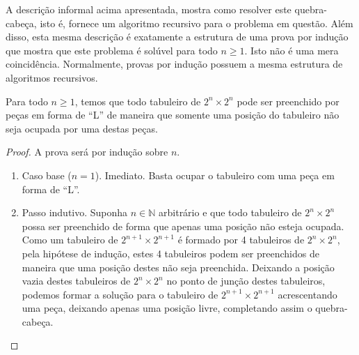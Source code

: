 A descrição informal acima apresentada, mostra como resolver este
quebra-cabeça, isto é, fornece um algoritmo recursivo para o problema
em questão. Além disso, esta mesma descrição é exatamente a estrutura
de uma prova por indução que mostra que este problema é solúvel para
todo $n \geq 1$. Isto não é uma mera coincidência. Normalmente, provas
por indução possuem a mesma estrutura de algoritmos recursivos.

\begin{Theorem}
Para todo $n \geq 1$, temos que todo tabuleiro de $2^n \times 2^n$
pode ser preenchido por peças em forma de ``L'' de maneira que somente
uma posição do tabuleiro não seja ocupada por uma destas peças.
\end{Theorem}
\begin{proof}
A prova será por indução sobre $n$.
\begin{enumerate}
  \item Caso base ($n = 1$). Imediato. Basta ocupar o tabuleiro com
    uma peça em forma de ``L''.
  \item Passo indutivo. Suponha $n \in \mathbb{N}$ arbitrário e que
    todo tabuleiro de $2^n \times 2^n$ possa ser preenchido de forma que
    apenas uma posição não esteja ocupada. Como um tabuleiro de $2^{n
      + 1} \times 2^{n + 1}$ é formado por 4 tabuleiros de $2^n\times
    2^n$, pela hipótese de indução, estes 4 tabuleiros podem ser
    preenchidos de maneira que uma posição destes não seja
    preenchida. Deixando a posição vazia destes tabuleiros de
    $2^n\times 2^n$ no ponto de junção destes tabuleiros, podemos
    formar a solução para o tabuleiro de $2^{n+1}\times 2^{n+1}$
    acrescentando uma peça, deixando apenas uma posição livre,
    completando assim o quebra-cabeça.
\end{enumerate}
\end{proof}

